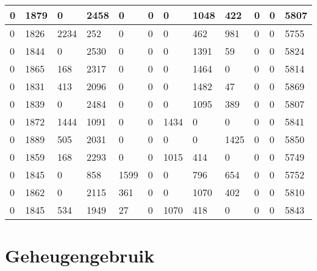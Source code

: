 \begin{longtable}{ | l | l | l | l | l | l | l | l | l | l | l || l | }
	0 & 1879 & 0 & 2458 & 0 & 0 & 0 & 1048 & 422 & 0 & 0 & 5807 \\ \hline
	0 & 1826 & 2234 & 252 & 0 & 0 & 0 & 462 & 981 & 0 & 0 & 5755   \\ \hline
	0 & 1844 & 0 & 2530 & 0 & 0 & 0 & 1391 & 59 & 0 & 0 & 5824    \\ \hline
	0 & 1865 & 168 & 2317 & 0 & 0 & 0 & 1464 & 0 & 0 & 0 & 5814  \\ \hline
	0 & 1831 & 413 & 2096 & 0 & 0 & 0 & 1482 & 47 & 0 & 0 & 5869    \\ \hline
	0 & 1839 & 0 & 2484 & 0 & 0 & 0 & 1095 & 389 & 0 & 0 & 5807   \\ \hline
	0 & 1872 & 1444 & 1091 & 0 & 0 & 1434 & 0 & 0 & 0 & 0 & 5841 \\\hline
	0 & 1889 & 505 & 2031 & 0 & 0 & 0 & 0 & 1425 & 0 & 0 & 5850    \\ \hline
	0 & 1859 & 168 & 2293 & 0 & 0 & 1015 & 414 & 0 & 0 & 0 & 5749  \\ \hline
	0 & 1845 & 0 & 858 & 1599 & 0 & 0 & 796 & 654 & 0 & 0 & 5752   \\ \hline
	0 & 1862 & 0 & 2115 & 361 & 0 & 0 & 1070 & 402 & 0 & 0 & 5810   \\ \hline
	0 & 1845 & 534 & 1949 & 27 & 0 & 1070 & 418 & 0 & 0 & 0 & 5843   \\ \hline



\end{longtable}


\section*{ Geheugengebruik}
\label{dataset:geheugengebruik}

